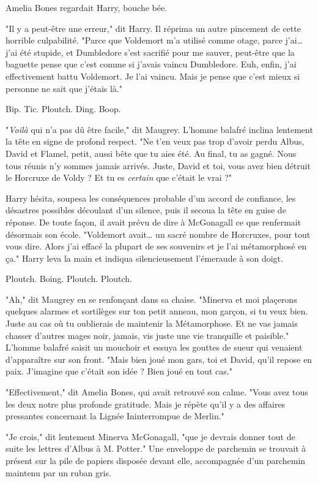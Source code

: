 Amelia Bones regardait Harry, bouche bée.

"Il y a peut-être une erreur," dit Harry. Il réprima un autre pincement de cette horrible culpabilité. "Parce que Voldemort m'a utilisé comme otage, parce j'ai… j'ai été stupide, et Dumbledore s'est sacrifié pour me sauver, peut-être que la baguette pense que c'est comme si j'avais vaincu Dumbledore. Euh, enfin, j'ai effectivement battu Voldemort. Je l'ai vaincu. Mais je pense que c'est mieux si personne ne sait que j'étais là."

Bip. Tic. Ploutch. Ding. Boop.

"\emph{Voilà}  qui n'a pas dû être facile," dit Maugrey. L'homme balafré inclina lentement la tête en signe de profond respect. "Ne t'en veux pas trop d'avoir perdu Albus, David et Flamel, petit, aussi bête que tu aies été. Au final, tu as gagné. Nous tous réunis n'y sommes jamais arrivés. Juste, David et toi, vous avez bien détruit le Horcruxe de Voldy ? Et tu es \emph{certain}  que c'était le vrai ?"

Harry hésita, soupesa les conséquences probable d'un accord de confiance, les désastres possibles découlant d'un silence, puis il secoua la tête en guise de réponse. De toute façon, il avait prévu de dire à McGonagall ce que renfermait désormais son école. "Voldemort avait… un sacré nombre de Horcruxes, pour tout vous dire. Alors j'ai effacé la plupart de ses souvenirs et je l'ai métamorphosé en ça." Harry leva la main et indiqua silencieusement l'émeraude à son doigt.

Ploutch. Boing. Ploutch. Ploutch.

"Ah," dit Maugrey en se renfonçant dans sa chaise. "Minerva et moi plaçerons quelques alarmes et sortilèges sur ton petit anneau, mon garçon, si tu veux bien. Juste au cas où tu oublierais de maintenir la Métamorphose. Et ne vas jamais chasser d'autres mages noir, jamais, vis juste une vie tranquille et paisible." L'homme balafré saisit un mouchoir et essuya les gouttes de sueur qui venaient d'apparaître sur son front. "Mais bien joué mon gars, toi et David, qu'il repose en paix. J'imagine que c'était son idée ? Bien joué en tout cas."

"Effectivement," dit Amelia Bones, qui avait retrouvé son calme. "Vous avez tous les deux notre plus profonde gratitude. Mais je répète qu'il y a des affaires pressantes concernant la Lignée Ininterrompue de Merlin."

"Je crois," dit lentement Minerva McGonagall, "que je devrais donner tout de suite les lettres d'Albus à M. Potter." Une enveloppe de parchemin se trouvait à présent sur la pile de papiers disposée devant elle, accompagnée d'un parchemin maintenu par un ruban gris.

